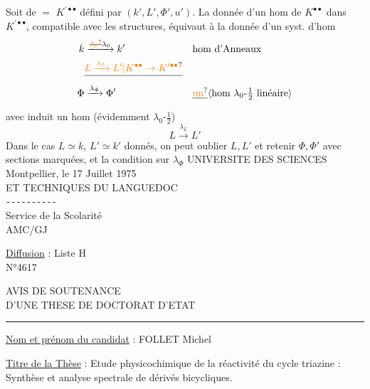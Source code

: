 Soit de $=$ $K^{\prime\bullet\bullet}$ défini par $(k',L',\Phi',u')$.  La donnée d'un hom \inserted{$\lambda$} de $K^{\bullet\bullet}$ dans $K^{\prime\bullet\bullet}$, compatible avec  les structures, équivaut à la donnée d'un syst. d'hom
\[
\begin{aligned}
k&\xrightarrow{\deleted{\unsure{\lambda_0}}\lambda_0}k' &&\text{hom d'Anneaux}\\
&\deleted{\unsure{L\xrightarrow{\lambda_L}L'|K^{\bullet\bullet}\to K^{\prime\bullet\bullet}}}\\
\Phi&\xrightarrow{\lambda_\Phi}\Phi' &&\deleted{\unsure{\text{un}}}\inserted{\text{hom }\lambda_0\text{-}\tfrac12\text{ linéaire}}
\end{aligned}
\]
avec  induit un hom (évidemment $\lambda_0$-$\frac12$)
\[
L\xrightarrow{\lambda_L}L'
\]
Dans le cas $L\simeq k$, $L'\simeq k'$ donnés, on peut oublier $L,L'$ et retenir $\Phi,\Phi'$ avec sections marquées, et la condition sur $\lambda_\Phi$
UNIVERSITE DES SCIENCES \hfill Montpellier, le 17 Juillet 1975\\
ET TECHNIQUES DU LANGUEDOC\\
\texttt{-{}-{}-{}-{}-{}-{}-{}-{}-{}-}\\
Service de la Scolarité\\
AMC/GJ

\uline{Diffusion} : Liste H\\
N°4617

AVIS DE SOUTENANCE\\
D'UNE THESE DE DOCTORAT D'ETAT

\begin{center}\rule{2cm}{0.4pt}\end{center}

\uline{Nom et prénom du candidat} : FOLLET Michel

\uline{Titre de la Thèse} : Etude physicochimique de la réactivité du cycle triazine : Synthèse et analyse spectrale de dérivés bicycliques.

